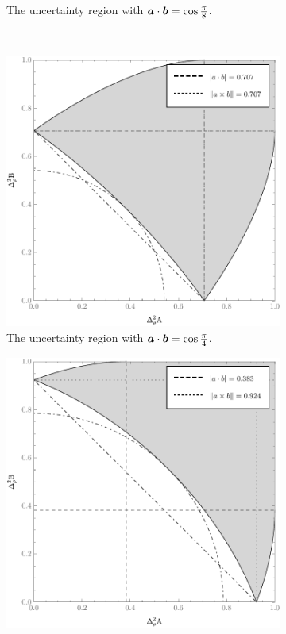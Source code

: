 \begin{figure}[ht]
\begin{subfigure}[b]{0.4\textwidth}
    \caption{The uncertainty region with $\bm{a}\cdot\bm{b} = \cos\frac{\pi}{8}$.}
    \label{fig:err-region-pi-by-8}
  \end{subfigure}\\
  \begin{subfigure}[b]{0.4\textwidth}\centering
    \includegraphics[width=\textwidth]{figs/new-qubit-error-region-with-upper-and-lower-bounds-pi-by-4-bw}
    \caption{The uncertainty region with $\bm{a}\cdot\bm{b} = \cos\frac{\pi}{4}$.}
    \label{fig:err-region-pi-by-4}
  \end{subfigure}\hfill
  \begin{subfigure}[b]{0.4\textwidth}\centering
    \includegraphics[width=\textwidth]{figs/new-qubit-error-region-with-upper-and-lower-bounds-3-pi-by-8-bw}

\end{subfigure}
\end{figure}
